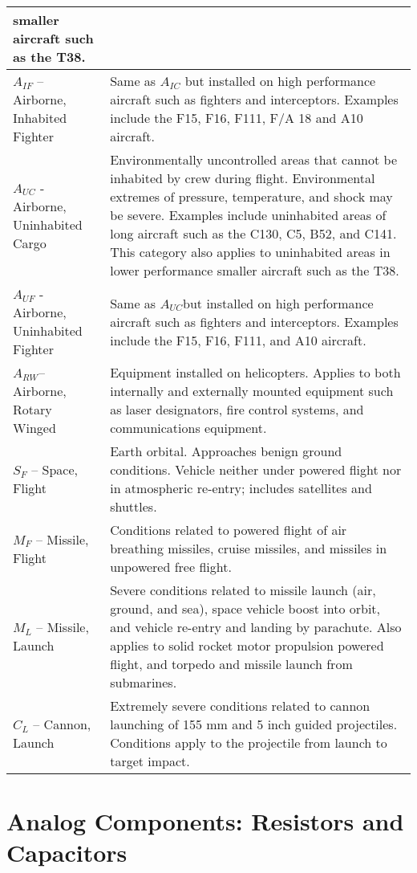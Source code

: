 \begin{longtable}{|m{4cm}|m{10cm}|}
smaller aircraft such as the T38. \\ \hline
$A_{IF}$ -- Airborne, Inhabited Fighter & Same as 
$A_{IC}$ but installed on high performance aircraft such as
fighters and interceptors. Examples include the F15, F16, F111, F/A 18
and A10 aircraft. \\ \hline
$A_{UC}$ - Airborne, Uninhabited Cargo & Environmentally
uncontrolled areas that cannot be inhabited by crew during flight.
Environmental extremes of pressure, temperature, and shock may be
severe. Examples include uninhabited areas of long aircraft such as the
C130, C5, B52, and C141. This category also applies to uninhabited areas
in lower performance smaller aircraft such as the T38. \\ \hline
$A_{UF}$ - Airborne, Uninhabited Fighter & Same as
$A_{UC}$but installed on high performance aircraft such as
fighters and interceptors. Examples include the F15, F16, F111, and A10
aircraft. \\ \hline
$A_{RW}$-- Airborne, Rotary Winged & Equipment installed on
helicopters. Applies to both internally and externally mounted equipment
such as laser designators, fire control systems, and communications
equipment. \\ \hline
$S_{F}$ -- Space, Flight & Earth orbital. Approaches benign
ground conditions. Vehicle neither under powered flight nor in
atmospheric re-entry; includes satellites and shuttles. \\ \hline
$M_{F}$ -- Missile, Flight & Conditions related to powered
flight of air breathing missiles, cruise missiles, and missiles in
unpowered free flight. \\ \hline
$M_{L}$ -- Missile, Launch & Severe conditions related to
missile launch (air, ground, and sea), space vehicle boost into orbit,
and vehicle re-entry and landing by parachute. Also applies to solid
rocket motor propulsion powered flight, and torpedo and missile launch
from submarines. \\ \hline
$C_{L}$ -- Cannon, Launch & Extremely severe conditions
related to cannon launching of 155 mm and 5 inch guided projectiles.
Conditions apply to the projectile from launch to target impact. \\ \hline
\end{longtable}
\normalsize

\newpage

\section{Analog Components: Resistors and Capacitors}
\label{section:analog-components-resistors-and-capacitors}

